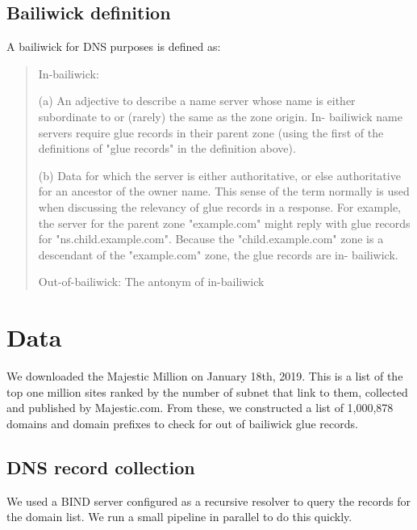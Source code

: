 \documentclass{idc_msc}
\begin{document}
\subsection{Bailiwick definition}

A bailiwick for DNS purposes is defined\cite{rfc7719} as:

\begin{quote}
In-bailiwick:

      (a) An adjective to describe a name server whose name is either
      subordinate to or (rarely) the same as the zone origin.  In-
      bailiwick name servers require glue records in their parent zone
      (using the first of the definitions of "glue records" in the
      definition above).

      (b) Data for which the server is either authoritative, or else
      authoritative for an ancestor of the owner name.  This sense of
      the term normally is used when discussing the relevancy of glue
      records in a response.  For example, the server for the parent
      zone "example.com" might reply with glue records for
      "ns.child.example.com".  Because the "child.example.com" zone is a
      descendant of the "example.com" zone, the glue records are in-
      bailiwick.

   Out-of-bailiwick:  The antonym of in-bailiwick
\end{quote}

\section{Data}

We downloaded the Majestic Million\cite{MajesticMillion} on January 18th, 2019.
This is a list of the top one million sites ranked by the number of subnet that link to them, collected and published by Majestic.com.
From these, we constructed a list of 1,000,878 domains and domain prefixes to check for out of bailiwick glue records.


\subsection{DNS record collection}

We used a BIND server configured as a recursive resolver to query the records for the domain list.
We run a small pipeline in parallel\cite{Tange2011a} to do this quickly.

\end{document}
